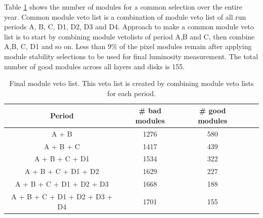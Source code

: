 
Table \ref{tab:2commonveto} shows the number of modules for a common selection over the entire year. Common module veto list is a combination of module veto list of all run periods A, B, C, D1, D2, D3 and D4. Approach to make a common module veto list is to start by combining module vetolists of period A,B and C, then combine A,B, C, D1 and so on. Less than $9\%$ of the pixel modules remain after applying module stability selections to be used for final luminosity measurement. The total number of good modules across all layers and disks is 155.


\begin{table}
  \begin{center}
    \caption[Common module veto list]{Final module veto list. This veto list is created by combining module veto lists for each period.}
    \begin{tabular}{ccccc}  
      \textbf{Period}   & \textbf{\# bad modules} & \textbf{\# good modules} \\  \hline
      A + B  & 1276 & 580 \\
     A + B + C      &  1417   &  439    \\  
     A + B + C + D1      &   1534  &   322    \\ 
     A + B + C + D1 + D2      &   1629 &    227   \\ 
     A + B + C + D1 + D2 + D3     &   1668 &   188    \\ 
     A + B + C + D1 + D2 + D3 + D4     &  1701 &     155  \\ 
      \end{tabular}
    \label{tab:2commonveto}
  \end{center}
\end{table}


